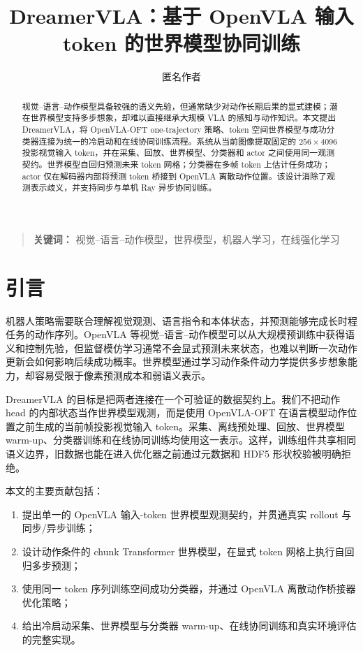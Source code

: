\documentclass{article}
\title{DreamerVLA：基于 OpenVLA 输入 token 的世界模型协同训练}
\author{匿名作者}
\def\keywords#1{%
  \ifdefined\isaccepted \else
    \begin{quote}
    \textbf{关键词：} #1%
    \end{quote}
  \fi
}
\begin{document}
\maketitle

\begin{abstract}
视觉--语言--动作模型具备较强的语义先验，但通常缺少对动作长期后果的显式建模；潜在世界模型支持多步想象，却难以直接继承大规模 VLA 的感知与动作知识。本文提出 DreamerVLA，将 OpenVLA-OFT one-trajectory 策略、token 空间世界模型与成功分类器连接为统一的冷启动和在线协同训练流程。系统从当前图像提取固定的 $256\times4096$ 投影视觉输入 token，并在采集、回放、世界模型、分类器和 actor 之间使用同一观测契约。世界模型自回归预测未来 token 网格；分类器在多帧 token 上估计任务成功；actor 仅在解码器内部将预测 token 桥接到 OpenVLA 离散动作位置。该设计消除了观测表示歧义，并支持同步与单机 Ray 异步协同训练。
\end{abstract}

\keywords{视觉--语言--动作模型，世界模型，机器人学习，在线强化学习}

\section{引言}

机器人策略需要联合理解视觉观测、语言指令和本体状态，并预测能够完成长时程任务的动作序列。OpenVLA 等视觉--语言--动作模型可以从大规模预训练中获得语义和控制先验，但监督模仿学习通常不会显式预测未来状态，也难以判断一次动作更新会如何影响后续成功概率。世界模型通过学习动作条件动力学提供多步想象能力，却容易受限于像素预测成本和弱语义表示。

DreamerVLA 的目标是把两者连接在一个可验证的数据契约上。我们不把动作 head 的内部状态当作世界模型观测，而是使用 OpenVLA-OFT 在语言模型动作位置之前生成的当前帧投影视觉输入 token。采集、离线预处理、回放、世界模型 warm-up、分类器训练和在线协同训练均使用这一表示。这样，训练组件共享相同语义边界，旧数据也能在进入优化器之前通过元数据和 HDF5 形状校验被明确拒绝。

本文的主要贡献包括：
\begin{enumerate}
  \item 提出单一的 OpenVLA 输入-token 世界模型观测契约，并贯通真实 rollout 与同步/异步训练；
  \item 设计动作条件的 chunk Transformer 世界模型，在显式 token 网格上执行自回归多步预测；
  \item 使用同一 token 序列训练空间成功分类器，并通过 OpenVLA 离散动作桥接器优化策略；
  \item 给出冷启动采集、世界模型与分类器 warm-up、在线协同训练和真实环境评估的完整实现。
\end{enumerate}
\end{document}
